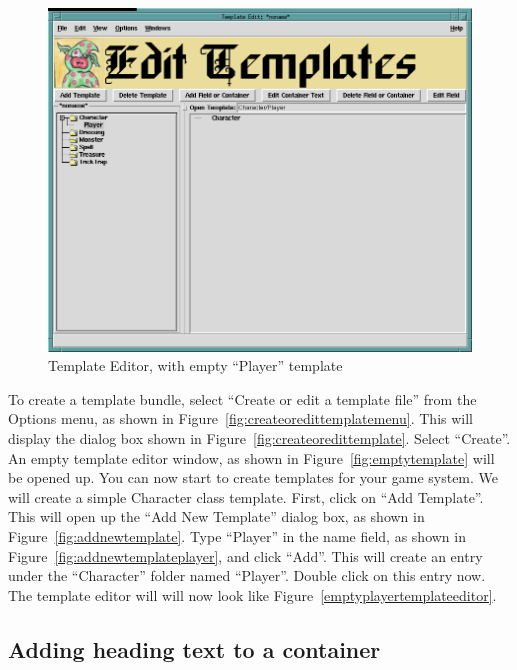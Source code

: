 \begin{figure}[hbpt]
\begin{centering}
\includegraphics[width=5in]{PlayerTemplateEditor.png}
\caption{Template Editor, with empty ``Player'' template}
\label{fig:emptyplayertemplateeditor}
\end{centering}
\end{figure}
To create a template bundle, select ``Create or edit a template file''
from the Options menu, as shown in
Figure~\ref{fig:createoredittemplatemenu}.  This will display the dialog box
shown in Figure~\ref{fig:createoredittemplate}.  Select ``Create''.  An
empty template editor window, as shown in Figure~\ref{fig:emptytemplate}
will be opened up.  You can now start to create templates for your game
system.  We will create a simple Character class template.  First, click
on ``Add Template''.  This will open up the ``Add New Template'' dialog
box, as shown in Figure~\ref{fig:addnewtemplate}.  Type ``Player'' in
the name field, as shown in Figure~\ref{fig:addnewtemplateplayer}, and
click ``Add''.  This will create an entry under the ``Character'' folder
named ``Player''.  Double click on this entry now.  The template editor
will will now look like Figure~\ref{emptyplayertemplateeditor}.

\subsection{Adding heading text to a container}


